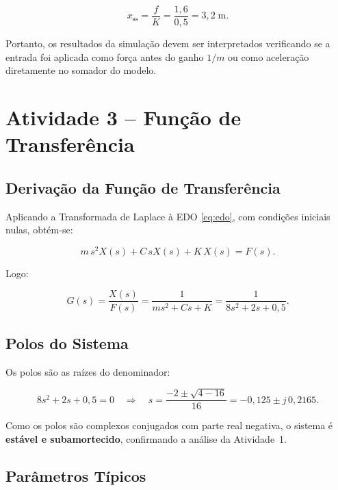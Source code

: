 \documentclass[12pt,a4paper]{article}
\begin{document}
\begin{equation}
  x_{\mathrm{ss}}=\frac{f}{K}=\frac{1{,}6}{0{,}5}=3{,}2\;\text{m}.
\end{equation}

Portanto, os resultados da simulação devem ser interpretados verificando se a entrada foi aplicada como força antes do ganho $1/m$ ou como aceleração diretamente no somador do modelo.

\section{Atividade 3 -- Função de Transferência}

\subsection{Derivação da Função de Transferência}

Aplicando a Transformada de Laplace à EDO \eqref{eq:edo}, com condições iniciais nulas, obtém-se:

\begin{equation}
  m\,s^2X(s)+C\,sX(s)+K\,X(s)=F(s).
\end{equation}

Logo:

\begin{equation}
  \boxed{G(s)=\frac{X(s)}{F(s)}=\frac{1}{ms^2+Cs+K}
  =\frac{1}{8s^2+2s+0{,}5}}.
  \label{eq:ft}
\end{equation}

\subsection{Polos do Sistema}

Os polos são as raízes do denominador:

\begin{equation}
  8s^2+2s+0{,}5=0
  \quad\Rightarrow\quad
  s=\frac{-2\pm\sqrt{4-16}}{16}
  = -0{,}125 \pm j\,0{,}2165.
\end{equation}

Como os polos são complexos conjugados com parte real negativa, o sistema é \textbf{estável e subamortecido}, confirmando a análise da Atividade~1.

\subsection{Parâmetros Típicos}
\end{document}
